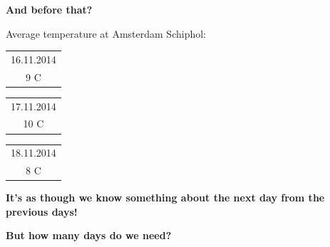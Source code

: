 \documentclass{beamer}
\newcommand{\placard}[1]{
  \begin{frame}
    \begin{center}
      \huge
      \textbf{#1}
    \end{center}
  \end{frame}
}
\newcommand{\pagestepalt}[2]{
  \begin{frame}[t]
    \begin{minipage}[t][0.26\textheight][t]{\textwidth}
      \begin{center}
        \huge
        \textbf{#1}
      \end{center}
    \end{minipage}
    
    \begin{minipage}[t][0.7\textheight][t]{\textwidth}
      #2
    \end{minipage}
  \end{frame}
}
\begin{document}
\pagestepalt{And before that?}{
  Average temperature at Amsterdam Schiphol:\\
  \begin{flushright}
    \begin{tabular}{|c|}
      \hline
      16.11.2014 \\
      {\Huge 9 C} \\
      \hline
    \end{tabular}
    \begin{tabular}{|c|}
      \hline
      17.11.2014 \\
      {\Huge 10 C} \\
      \hline
    \end{tabular}
    \begin{tabular}{|c|}
      \hline
      18.11.2014 \\
      {\Huge 8 C} \\
      \hline
    \end{tabular}
  \end{flushright}
}


\placard{It's as though we know something about the next day from the
  previous days!}

\placard{But how many days do we need?}
\end{document}
